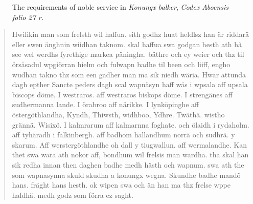 \documentclass[a4paper]{article}
\newcommand{\abgreen}[1]{{\addfontfeature{Color=62876E}#1}}
\begin{document}
\begin{figure}
{{\fontsize{15}{18}\selectfont\raggedright
    \abl{dhä. medh godz som   förra ez saght. \abgreen{!>>>***>>>!} }}}
\caption{The requirements of noble service in \emph{Konungx balker},
  \emph{Codex Aboensis folio 27 r.}}
  
\end{figure}


\begin{quote}
  Hwilikin man som frelsth wil haffua. sith godhz huat heldlsz han är
  riddarä eller swen änghnin wiidhan taknom. skal haffua swa godgan
  hesth ath hã see wel werdhs fyrethige markea päningha. bäthre och ey
  weier och thz til örsäsadul wpgiörran hielm och fulwapn badhe til
  been och liiff, engho wudhan takno thz som een gadher man ma sik
  niedh wäria. Hwar attunda dagh epther Sancte peders dagh scal
  wapnäsyn haff wäs i wpsala aff upsala biscops döme. I westraros. aff
  westraros biskops döme. I strengänes aff sudhermanna lande. I
  örabroo aff närikke. I lynköpinghe aff östergöthlandha, Kyndh,
  Thiwsth, widhboo, Ydhre. Twäthä. wistho grännä. Wisixö. I kalmrarum
  aff kalmarnna foghate. och ölaidh i rydaholm. aff tyhäradh i
  falkinbergh. aff badhom hallandhum norrä och sudhrä. y skarum. Aff
  werstergöthlandhe oh dall y tiugwallun. aff wermalandhe. Kan thet
  swa wara ath nokor aff, bondhum wil frelsis man wardha. tha skal han
  sik redha innan then daghen badhe medh hästh och wapnum. swa ath the
  som wapnasynna skuld skudha a konungx wegna. Skundhe
  badhe mandõ hans. fräght hans hesth. ok wipen swa och än han ma
  thz frelse wppe haldhä. medh godz som förra ez saght.
\end{quote}
\end{document}
